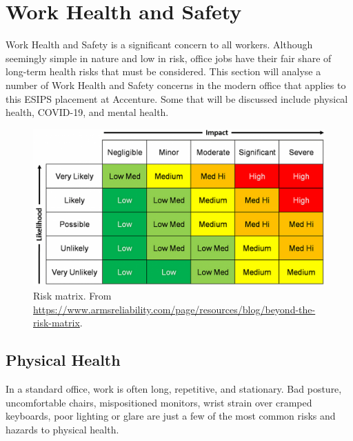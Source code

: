 \graphicspath{{./Appendix/Figs/}}

\cleardoublepage
\chapter{Work Health and Safety}
\label{app:whs}


Work Health and Safety is a significant concern to all workers. Although seemingly simple in nature and low in risk, office jobs have their fair share of long-term health risks that must be considered. This section will analyse a number of Work Health and Safety concerns in the modern office that applies to this ESIPS placement at Accenture. Some that will be discussed include physical health, COVID-19, and mental health. 

\begin{figure}[H]
  \centering
  \includegraphics[width=\textwidth]{risk_matrix.png}
  \caption[Risk matrix.]{Risk matrix. From \url{https://www.armsreliability.com/page/resources/blog/beyond-the-risk-matrix}.}
  \label{fig:risk_matrix}
\end{figure}


\section{Physical Health}
In a standard office, work is often long, repetitive, and stationary. Bad posture, uncomfortable chairs, mispositioned monitors, wrist strain over cramped keyboards, poor lighting or glare are just a few of the most common risks and hazards to physical health. 

